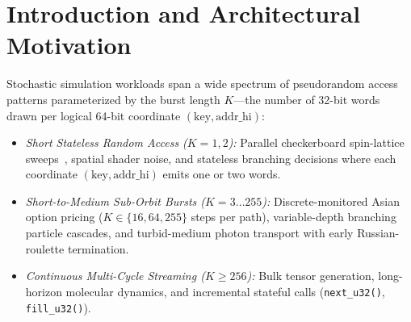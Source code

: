 \documentclass[conference]{IEEEtran}
\begin{document}
\section{Introduction and Architectural Motivation}\label{sec:intro}

Stochastic simulation workloads span a wide spectrum of pseudorandom access patterns parameterized by the burst length $K$---the number of 32-bit words drawn per logical 64-bit coordinate $(\text{key}, \text{addr\_hi})$:
\begin{itemize}
    \item \emph{Short Stateless Random Access ($K = 1, 2$):} Parallel checkerboard spin-lattice sweeps~\cite{metropolis1953equation,onsager1944crystal}, spatial shader noise, and stateless branching decisions where each coordinate $(\text{key}, \text{addr\_hi})$ emits one or two words.
    \item \emph{Short-to-Medium Sub-Orbit Bursts ($K = 3\ldots 255$):} Discrete-monitored Asian option pricing ($K \in \{16, 64, 255\}$ steps per path), variable-depth branching particle cascades, and turbid-medium photon transport with early Russian-roulette termination.
    \item \emph{Continuous Multi-Cycle Streaming ($K \ge 256$):} Bulk tensor generation, long-horizon molecular dynamics, and incremental stateful calls (\texttt{next\_u32()}, \texttt{fill\_u32()}).
\end{itemize}
\end{document}
